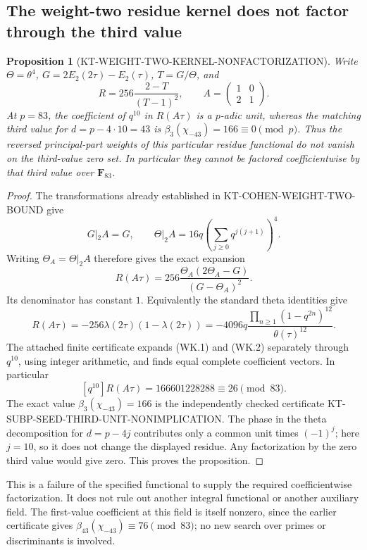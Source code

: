\documentclass[11pt,a4paper]{article}
\newtheorem{proposition}[theorem]{Proposition}
\theoremstyle{definition}
\begin{document}


\subsection{The weight-two residue kernel does not factor through the third value}

\begin{proposition}[KT-WEIGHT-TWO-KERNEL-NONFACTORIZATION]
Write $\Theta=\theta^4$, $G=2E_2(2\tau)-E_2(\tau)$,
$T=G/\Theta$, and
\[
 R=256\frac{2-T}{(T-1)^2},\qquad
 A=\begin{pmatrix}1&0\\2&1\end{pmatrix}.
\]
At $p=83$, the coefficient of $q^{10}$ in $R(A\tau)$ is a
$p$-adic unit, whereas the matching third value for
$d=p-4\cdot10=43$ is $\beta_3(\chi_{-43})=166\equiv0\pmod p$.
Thus the reversed principal-part weights of this particular residue
functional do not vanish on the third-value zero set.  In particular
they cannot be factored coefficientwise by that third value over
$\mathbf F_{83}$.
\end{proposition}

\begin{proof}
The transformations already established in
KT-COHEN-WEIGHT-TWO-BOUND give
\[
 G|_2A=G,\qquad
 \Theta|_2A=16q\left(\sum_{j\geq0}q^{j(j+1)}\right)^4.
\]
Writing $\Theta_A=\Theta|_2A$ therefore gives the exact expansion
\[
 R(A\tau)=256\frac{\Theta_A(2\Theta_A-G)}{(G-\Theta_A)^2}.
 \tag{WK.1}
\]
Its denominator has constant $1$.  Equivalently the standard theta
identities give
\[
 R(A\tau)=-256\lambda(2\tau)(1-\lambda(2\tau))
   =-4096q\frac{\prod_{n\geq1}(1-q^{2n})^{12}}{\theta(\tau)^{12}}.
 \tag{WK.2}
\]
The attached finite certificate expands (WK.1) and (WK.2) separately
through $q^{10}$, using integer arithmetic, and finds equal complete
coefficient vectors.  In particular
\[
 [q^{10}]R(A\tau)=166601228288\equiv26\pmod{83}.
\]
The exact value $\beta_3(\chi_{-43})=166$ is the independently checked
certificate KT-SUBP-SEED-THIRD-UNIT-NONIMPLICATION.  The phase in the
theta decomposition for $d=p-4j$ contributes only a common unit times
$(-1)^j$; here $j=10$, so it does not change the displayed residue.
Any factorization by the zero third value would give zero.  This
proves the proposition.
\end{proof}

This is a failure of the specified functional to supply the required
coefficientwise factorization.  It does not rule out another integral
functional or another auxiliary field.  The first-value coefficient at
this field is itself nonzero, since the earlier certificate gives
$\beta_{43}(\chi_{-43})\equiv76\pmod{83}$; no new search over primes or
discriminants is involved.
\end{document}
